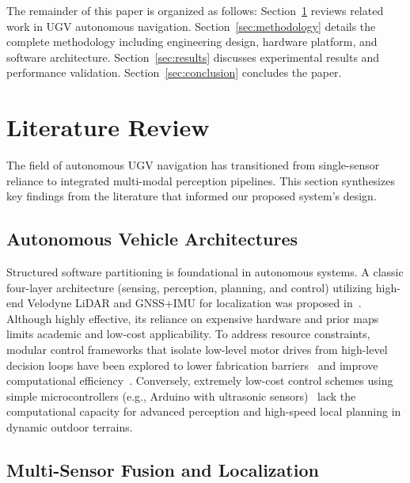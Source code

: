 \documentclass[conference]{IEEEtran}
\begin{document}
The remainder of this paper is organized as follows: Section~\ref{sec:literature} reviews related work in UGV autonomous navigation. Section~\ref{sec:methodology} details the complete methodology including engineering design, hardware platform, and software architecture. Section~\ref{sec:results} discusses experimental results and performance validation. Section~\ref{sec:conclusion} concludes the paper.

\section{Literature Review}
\label{sec:literature}

The field of autonomous UGV navigation has transitioned from single-sensor reliance to integrated multi-modal perception pipelines. This section synthesizes key findings from the literature that informed our proposed system's design.

\subsection{Autonomous Vehicle Architectures}

Structured software partitioning is foundational in autonomous systems. A classic four-layer architecture (sensing, perception, planning, and control) utilizing high-end Velodyne LiDAR and GNSS+IMU for localization was proposed in~\cite{azam2020system}. Although highly effective, its reliance on expensive hardware and prior maps limits academic and low-cost applicability. To address resource constraints, modular control frameworks that isolate low-level motor drives from high-level decision loops have been explored to lower fabrication barriers~\cite{gadekar2023recent} and improve computational efficiency~\cite{khriji2016integration}. Conversely, extremely low-cost control schemes using simple microcontrollers (e.g., Arduino with ultrasonic sensors)~\cite{fernandez2019unmanned} lack the computational capacity for advanced perception and high-speed local planning in dynamic outdoor terrains.

\subsection{Multi-Sensor Fusion and Localization}
\end{document}
